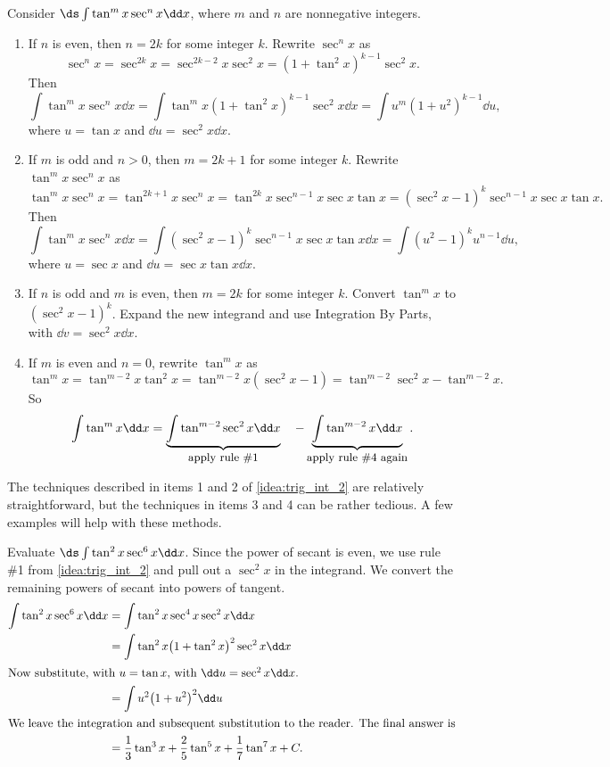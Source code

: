 {
\begin{keyidea}\label{idea:trig_int_2}
Consider $\ds\int\tan^mx\sec^nx\dd x$, where $m$ and $n$ are nonnegative integers.
\begin{enumerate}
\item		If $n$ is even, then $n=2k$ for some integer $k$. Rewrite $\sec^nx$ as 
\[\sec^nx = \sec^{2k}x = \sec^{2k-2}x\sec^2x = (1+\tan^2x)^{k-1}\sec^2x.\]
Then
\[
\int\tan^mx\sec^nx\dd x=\int\tan^mx(1+\tan^2x)^{k-1}\sec^2x\dd x = \int u^m(1+u^2)^{k-1}\dd u,
\]
where $u = \tan x$ and $\dd u = \sec^2x\dd x$.

\item		If $m$ is odd and $n>0$, then $m=2k+1$ for some integer $k$. Rewrite $\tan^mx\sec^nx$ as
\[
\tan^mx\sec^nx = \tan^{2k+1}x\sec^nx = \tan^{2k}x\sec^{n-1}x\sec x\tan x = (\sec^2x-1)^k\sec^{n-1}x\sec x\tan x.
\]
Then
\[
\int\tan^mx\sec^nx\dd x=\int(\sec^2x-1)^k\sec^{n-1}x\sec x\tan x\dd x = \int(u^2-1)^ku^{n-1}\dd u,
\]
where $u = \sec x$ and $\dd u = \sec x\tan x\dd x$.

\item If $n$ is odd and $m$ is even, then $m=2k$ for some integer $k$. Convert $\tan^mx $ to $(\sec^2x-1)^k$. Expand the new integrand and use Integration By Parts, with $\dd v = \sec^2x\dd x$.

\item		If $m$ is even and $n=0$, rewrite $\tan^mx$ as
\[
\tan^mx = \tan^{m-2}x\tan^2x = \tan^{m-2}x(\sec^2x-1) = \tan^{m-2}\sec^2x-\tan^{m-2}x.
\]
So
\[
\int\tan^mx\dd x = \underbrace{\int\tan^{m-2}\sec^2x\dd x}_{\text{\small apply rule \#1}}\quad - \underbrace{\int\tan^{m-2}x\dd x}_{\text{\small apply rule \#4 again}}.
\]

\end{enumerate}
\end{keyidea}
}

The techniques described in items 1 and 2 of \autoref{idea:trig_int_2} are relatively straightforward, but the techniques in items 3 and 4 can be rather tedious. A few examples will help with these methods.

\begin{example}\label{ex_trigint5}
Evaluate $\ds\int \tan^2x\sec^6x\dd x$.
\solution
Since the power of secant is even, we use rule \#1 from \autoref{idea:trig_int_2} and pull out a $\sec^2x$ in the integrand. We convert the remaining powers of secant into powers of tangent.
\begin{align*}
\int \tan^2x\sec^6x\dd x &= \int\tan^2x\sec^4x\sec^2x\dd x \\
		&= \int \tan^2x\bigl(1+\tan^2x\bigr)^2\sec^2x\dd x \\
\intertext{Now substitute, with $u=\tan x$, with $\dd u = \sec^2x\dd x$.}
		&=\int u^2\bigl(1+u^2\bigr)^2\dd u\\
\intertext{We leave the integration and subsequent substitution to the reader. The final answer is}
		&=\frac13\tan^3x+\frac25\tan^5x+\frac17\tan^7x+C.
\end{align*}
\end{example}

